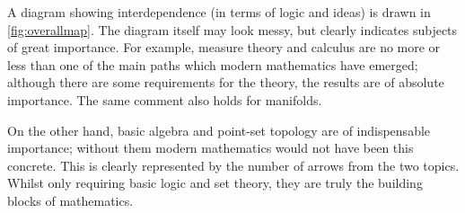 A diagram showing interdependence (in terms of logic and ideas)
is drawn in \cref{fig:overallmap}.
The diagram itself may look messy,
but clearly indicates subjects of great importance.
For example, measure theory and calculus are no more or less than
one of the main paths which modern mathematics have emerged;
although there are some requirements for the theory,
the results are of absolute importance.
The same comment also holds for manifolds.

On the other hand,
basic algebra and point-set topology are of indispensable importance;
without them modern mathematics would not have been this concrete.
This is clearly represented by the number of arrows from the two topics.
Whilst only requiring basic logic and set theory,
they are truly the building blocks of mathematics.
\begin{figure}
    \centering
\end{figure}
